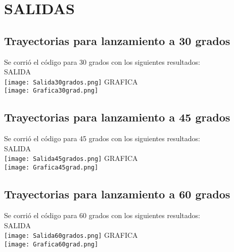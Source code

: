 \documentclass[letterpaper,10pt,twoside,onecolumn]{article}
\begin{document}
\section{SALIDAS}
\subsection{Trayectorias para lanzamiento a 30 grados}
Se corrió el código para 30 grados con los siguientes resultados:\\
SALIDA\\
\texttt{[image: Salida30grados.png]}
GRAFICA\\
\texttt{[image: Grafica30grad.png]}
\pagebreak
\subsection{Trayectorias para lanzamiento a 45 grados}

Se corrió el código para 45 grados con los siguientes resultados:\\
SALIDA\\
\texttt{[image: Salida45grados.png]}
GRAFICA\\
\texttt{[image: Grafica45grad.png]}

\subsection{Trayectorias para lanzamiento a 60 grados}
Se corrió el código para 60 grados con los siguientes resultados:\\
SALIDA\\
\texttt{[image: Salida60grados.png]}
GRAFICA\\
\texttt{[image: Grafica60grad.png]}

\end{document}
